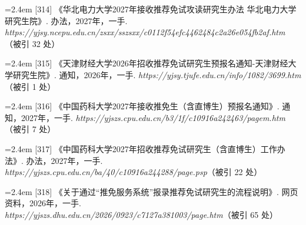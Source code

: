 {\vspace{0.6pt}
\noindent\hangindent=2.4em \label{src:S0415}{\color{cAccent}[314]} 《华北电力大学2027年接收推荐免试攻读研究生办法 华北电力大学研究生院》. 办法，2027年，一手. \textit{https://yjsy.ncepu.edu.cn/zsxx/sszsxx/c0112f54efc4462484c2a26e054fb2af.htm}（被引 32 处）\par
\vspace{0.6pt}
\vspace{3.5pt}\par
\nopagebreak\vspace{1pt}
\noindent\hangindent=2.4em \label{src:S0416}{\color{cAccent}[315]} 《天津财经大学2026年招收推荐免试研究生预报名通知-天津财经大学研究生院》. 通知，2026年，一手. \textit{https://yjsy.tjufe.edu.cn/info/1082/3699.htm}（被引 1 处）\par
\vspace{0.6pt}
\vspace{3.5pt}\par
\nopagebreak\vspace{1pt}
\noindent\hangindent=2.4em \label{src:S0417}{\color{cAccent}[316]} 《中国药科大学2027年接收推免生（含直博生）预报名通知》. 通知，2027年，一手. \textit{https://yjszs.cpu.edu.cn/b3/1f/c10916a242463/pagem.htm}（被引 7 处）\par
\vspace{0.6pt}
\noindent\hangindent=2.4em \label{src:S0418}{\color{cAccent}[317]} 《中国药科大学2027年招收推荐免试研究生（含直博生）工作办法》. 办法，2027年，一手. \textit{https://yjszs.cpu.edu.cn/ba/40/c10916a244288/page.psp}（被引 22 处）\par
\vspace{0.6pt}
\vspace{3.5pt}\par
\nopagebreak\vspace{1pt}
\noindent\hangindent=2.4em \label{src:S0419}{\color{cAccent}[318]} 《关于通过“推免服务系统”报录推荐免试研究生的流程说明》. 网页资料，2026年，一手. \textit{https://yjszs.dhu.edu.cn/2026/0923/c7127a381003/page.htm}（被引 65 处）\par
\vspace{0.6pt}
\vspace{3.5pt}\par
\nopagebreak\vspace{1pt}
}
